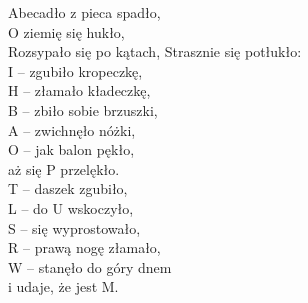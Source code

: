 \documentclass{article}
\begin{document}
	\begin{center}
		Abecadło z pieca spadło, \\
		O ziemię się hukło, \\
		Rozsypało się po kątach,
		Strasznie się potłukło: \\
		I – zgubiło kropeczkę, \\
		H – złamało kładeczkę, \\
		B – zbiło sobie brzuszki, \\
		A – zwichnęło nóżki, \\
		O – jak balon pękło, \\
		aż się P przelękło. \\
		T – daszek zgubiło, \\
		L – do U wskoczyło, \\
		S – się wyprostowało, \\
		R – prawą nogę złamało, \\
		W – stanęło do góry dnem \\
		i udaje, że jest M.
	\end{center}
\end{document}
